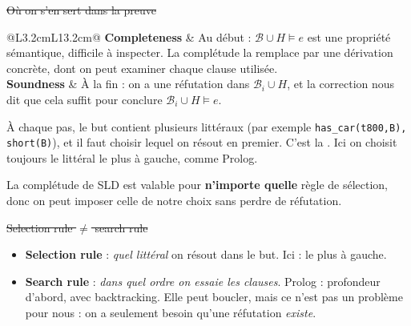 \documentclass[10pt]{article}
\begin{document}
\st{Où on s'en sert dans la preuve}
\begin{tabular}{@{}L{3.2cm}L{13.2cm}@{}}
\textbf{Completeness} & Au début : $\mathcal{B}\cup H\models e$ est une propriété sémantique, difficile à inspecter. La complétude la remplace par une dérivation concrète, dont on peut examiner chaque clause utilisée.\\[3pt]
\textbf{Soundness} & À la fin : on a une réfutation dans $\mathcal{B}_i\cup H$, et la correction nous dit que cela suffit pour conclure $\mathcal{B}_i\cup H\models e$.\\
\end{tabular}

À chaque pas, le but contient plusieurs littéraux (par exemple \texttt{has\_car(t800,B), short(B)}), et il faut
choisir lequel on résout en premier. C'est la . Ici on choisit toujours
le littéral le plus à gauche, comme Prolog.\par\vspace{3pt}
La complétude de SLD est valable pour \textbf{n'importe quelle} règle de sélection, donc on peut imposer celle
de notre choix sans perdre de réfutation.

\st{Selection rule $\neq$ search rule}
\begin{itemize}
  \item \textbf{Selection rule} : \emph{quel littéral} on résout dans le but. Ici : le plus à gauche.
  \item \textbf{Search rule} : \emph{dans quel ordre on essaie les clauses}. Prolog : profondeur d'abord, avec backtracking.
        Elle peut boucler, mais ce n'est pas un problème pour nous : on a seulement besoin qu'une réfutation \emph{existe}.
\end{itemize}
\end{document}
